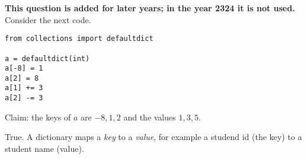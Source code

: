 \documentclass[stochastic-or.tex]{subfiles}
\begin{document}
\begin{truefalse} \textbf{This question is added for later years; in the year 2324 it is not used.}
Consider the next code.
\begin{verbatim}
from collections import defaultdict

a = defaultdict(int)
a[-8] = 1
a[2] = 8
a[1] += 3
a[2] -= 3
\end{verbatim}
Claim:  the keys of $a$ are $-8, 1, 2$ and the values $1, 3, 5$.
\begin{solution}
True. A dictionary maps a \emph{key} to a \emph{value}, for example  a studend id (the key) to a student name (value).
\end{solution}
\end{truefalse}



\end{document}
